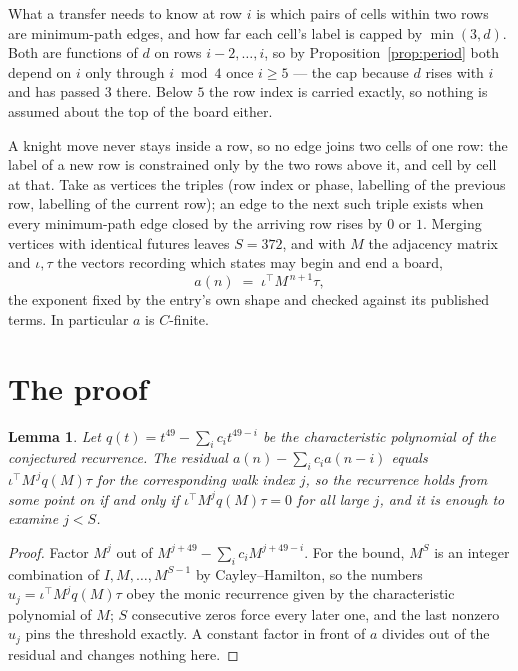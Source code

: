 \documentclass[11pt,a4paper]{article}
\theoremstyle{plain}
\newtheorem{lemma}[theorem]{Lemma}
\theoremstyle{definition}
\begin{document}
What a transfer needs to know at row $i$ is which pairs of cells within two rows are minimum-path edges, and how far each cell's label is capped by $\min(3,d)$. Both are functions of $d$ on rows $i-2,\dots,i$, so by Proposition~\ref{prop:period} both depend on $i$ only through $i\bmod 4$ once $i\ge5$ --- the cap because $d$ rises with $i$ and has passed $3$ there. Below $5$ the row index is carried exactly, so nothing is assumed about the top of the board either.

A knight move never stays inside a row, so no edge joins two cells of one row: the label of a new row is constrained only by the two rows above it, and cell by cell at that. Take as vertices the triples (row index or phase, labelling of the previous row, labelling of the current row); an edge to the next such triple exists when every minimum-path edge closed by the arriving row rises by $0$ or $1$. Merging vertices with identical futures leaves $S=372$, and with $M$ the adjacency matrix and $\iota,\tau$ the vectors recording which states may begin and end a board,
\[
a(n)\;=\;\iota^{\!\top}M^{\,n+1}\tau ,
\]
the exponent fixed by the entry's own shape and checked against its published terms. In
particular $a$ is $C$-finite.

\section{The proof}

\begin{lemma}\label{lem:crit}
Let $q(t)=t^{49}-\sum_i c_it^{49-i}$ be the characteristic polynomial of the
conjectured recurrence. The residual $a(n)-\sum_ic_ia(n-i)$ equals
$\iota^{\!\top}M^{\,j}q(M)\tau$ for the corresponding walk index $j$, so the recurrence
holds from some point on if and only if $\iota^{\!\top}M^{j}q(M)\tau=0$ for all large $j$,
and it is enough to examine $j<S$.
\end{lemma}

\begin{proof}
Factor $M^{j}$ out of $M^{j+49}-\sum_ic_iM^{j+49-i}$. For the bound, $M^{S}$
is an integer combination of $I,M,\dots,M^{S-1}$ by Cayley--Hamilton, so the numbers
$u_j=\iota^{\!\top}M^{j}q(M)\tau$ obey the monic recurrence given by the characteristic
polynomial of $M$; $S$ consecutive zeros force every later one, and the last nonzero $u_j$
pins the threshold exactly. A constant factor in front of $a$ divides out of the residual and
changes nothing here.
\end{proof}
\end{document}
